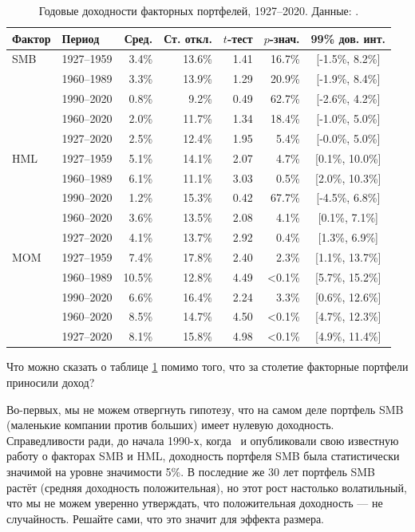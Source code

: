 \begin{table}[h]
\centering
\begin{tabular}{l|l|r|r|r|r|c}
Фактор & Период & Сред. & Ст. откл. & $t$-тест & $p$-знач. & 99\% дов. инт. \\
\hline
SMB & 1927--1959 &  3.4\% & 13.6\% & 1.41 & 16.7\% & [-1.5\%, 8.2\%] \\
    & 1960--1989 &  3.3\% & 13.9\% & 1.29 & 20.9\% & [-1.9\%, 8.4\%] \\
    & 1990--2020 &  0.8\% & 9.2\%  & 0.49 & 62.7\% & [-2.6\%, 4.2\%] \\
    & 1960--2020 &  2.0\% & 11.7\% & 1.34 & 18.4\% & [-1.0\%, 5.0\%] \\
    & 1927--2020 &  2.5\% & 12.4\% & 1.95 &  5.4\% & [-0.0\%, 5.0\%] \\ \hline

HML & 1927--1959 &  5.1\% & 14.1\% & 2.07 &  4.7\% & [0.1\%, 10.0\%] \\
    & 1960--1989 &  6.1\% & 11.1\% & 3.03 &  0.5\% & [2.0\%, 10.3\%] \\
    & 1990--2020 &  1.2\% & 15.3\% & 0.42 & 67.7\% & [-4.5\%, 6.8\%] \\
    & 1960--2020 &  3.6\% & 13.5\% & 2.08 &  4.1\% & [0.1\%, 7.1\%]  \\
    & 1927--2020 &  4.1\% & 13.7\% & 2.92 &  0.4\% & [1.3\%, 6.9\%]  \\ \hline
  
MOM & 1927--1959 &  7.4\% & 17.8\% & 2.40 &  2.3\% & [1.1\%, 13.7\%] \\
    & 1960--1989 & 10.5\% & 12.8\% & 4.49 & <0.1\% & [5.7\%, 15.2\%] \\
    & 1990--2020 &  6.6\% & 16.4\% & 2.24 &  3.3\% & [0.6\%, 12.6\%] \\
    & 1960--2020 &  8.5\% & 14.7\% & 4.50 & <0.1\% & [4.7\%, 12.3\%] \\
    & 1927--2020 &  8.1\% & 15.8\% & 4.98 & <0.1\% & [4.9\%, 11.4\%] \\
\end{tabular}
\caption{Годовые доходности факторных портфелей, 1927--2020. Данные: 
\cite{kennethFrench}.}
\label{us_factor_returns_table}
\end{table}

Что можно сказать о таблице \ref{us_factor_returns_table} помимо того, что за 
столетие факторные портфели приносили доход?

Во-первых, мы не можем отвергнуть гипотезу, что на самом деле портфель SMB 
(маленькие компании против больших) имеет нулевую доходность. Справедливости 
ради, до начала 1990-х, когда \ и 
 опубликовали свою известную 
работу \cite{Fama93commonrisk} о факторах SMB и HML, доходность портфеля SMB 
была статистически значимой на уровне значимости 5\%. В последние же 30 лет 
портфель SMB растёт (средняя доходность положительная), но этот рост настолько 
волатильный, что мы не можем уверенно утверждать, что положительная доходность 
--- не случайность. Решайте сами, что это значит для эффекта размера.

